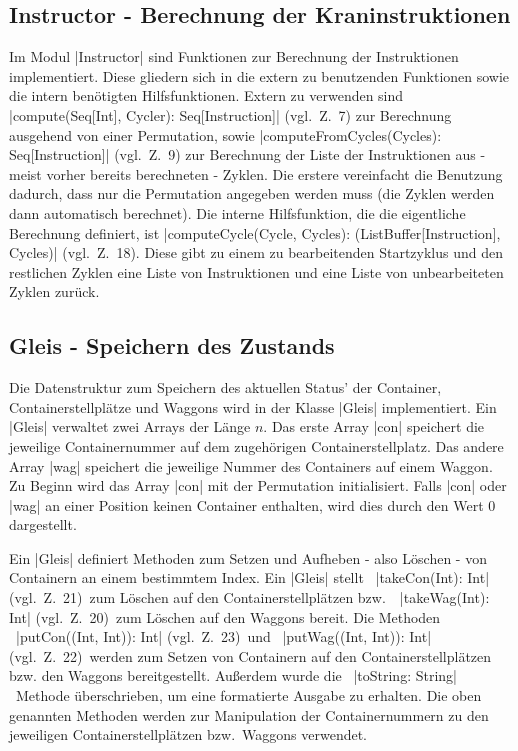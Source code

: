 \subsection{Instructor - Berechnung der Kraninstruktionen}
Im Modul |Instructor| sind Funktionen zur Berechnung der Instruktionen implementiert.
Diese gliedern sich in die extern zu benutzenden Funktionen sowie die intern benötigten Hilfsfunktionen.
Extern zu verwenden sind |compute(Seq[Int], Cycler): Seq[Instruction]| (vgl.\ Z.\ 7) zur Berechnung ausgehend von einer Permutation,
sowie |computeFromCycles(Cycles): Seq[Instruction]| (vgl.\ Z.\ 9) zur Berechnung der Liste der Instruktionen aus - meist vorher bereits berechneten - Zyklen.
Die erstere vereinfacht die Benutzung dadurch, dass nur die Permutation angegeben werden muss (die Zyklen werden dann automatisch berechnet).
Die interne Hilfsfunktion, die die eigentliche Berechnung definiert, ist |computeCycle(Cycle, Cycles): (ListBuffer[Instruction], Cycles)| (vgl.\ Z.\ 18).
Diese gibt zu einem zu bearbeitenden Startzyklus und den restlichen Zyklen eine Liste von Instruktionen und eine Liste von unbearbeiteten Zyklen zurück.

\subsection{Gleis - Speichern des Zustands}
\label{gleis}
Die Datenstruktur zum Speichern des aktuellen Status' der Container, Containerstellplätze und Waggons wird in der Klasse |Gleis| implementiert.
Ein |Gleis| verwaltet zwei Arrays der Länge $n$. Das erste Array |con| speichert die jeweilige Containernummer auf dem zugehörigen Containerstellplatz.
Das andere Array |wag| speichert die jeweilige Nummer des Containers auf einem Waggon.
Zu Beginn wird das Array |con| mit der Permutation initialisiert.
Falls |con| oder |wag| an einer Position keinen Container enthalten, wird dies durch den Wert 0 dargestellt.

Ein |Gleis| definiert Methoden zum Setzen und Aufheben - also Löschen - von Containern an einem bestimmtem Index.
Ein |Gleis| stellt \ |takeCon(Int): Int| (vgl.\ Z.\ 21)\  zum Löschen auf den Containerstellplätzen bzw.\ \ |takeWag(Int): Int| (vgl.\ Z.\ 20)\  zum Löschen auf den Waggons bereit.
Die Methoden \ |putCon((Int, Int)): Int| (vgl.\ Z.\ 23)\  und \ |putWag((Int, Int)): Int| (vgl.\ Z.\ 22)\  werden zum Setzen von Containern auf den Containerstellplätzen bzw. den Waggons bereitgestellt.
Außerdem wurde die \ |toString: String|\  Methode über\-schrie\-ben, um eine formatierte Ausgabe zu erhalten.
Die oben genannten Methoden werden zur Manipulation der Containernummern zu den jeweiligen Containerstellplätzen bzw.\ Waggons verwendet.

